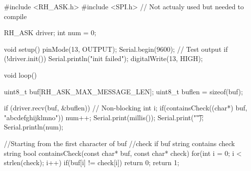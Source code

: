 #include <RH_ASK.h>
#include <SPI.h> // Not actualy used but needed to compile

RH_ASK driver;
int num = 0;

void setup()
{
    pinMode(13, OUTPUT);
    Serial.begin(9600);	// Test output
    if (!driver.init())
         Serial.println("init failed");
    digitalWrite(13, HIGH);
}

void loop()
{
    uint8_t buf[RH_ASK_MAX_MESSAGE_LEN];
    uint8_t buflen = sizeof(buf);

    if (driver.recv(buf, &buflen)) // Non-blocking
    {
      int i;
      if(containsCheck((char*) buf, "abcdefghijklmno"))
        num++;
      Serial.print(millis());
      Serial.print("\t");
      Serial.println(num);
    }
}
 
//Starting from the first character of buf
//check if buf string contains check string 
bool containsCheck(const char* buf, const char* check){
  for(int i = 0; i < strlen(check); i++)
    if(buf[i] != check[i])
      return 0;
  return 1;  
}